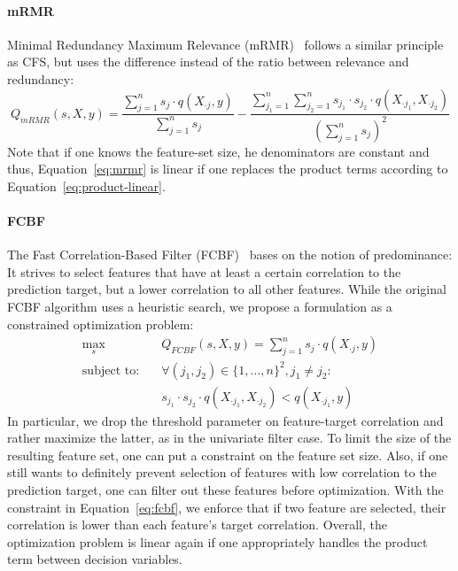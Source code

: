 \documentclass{article}
\theoremstyle{definition}
\begin{document}
\paragraph{mRMR}

Minimal Redundancy Maximum Relevance (mRMR)~\cite{peng2005feature} follows a similar principle as CFS, but uses the difference instead of the ratio between relevance and redundancy:
%
\begin{equation}
	Q_{mRMR}(s,X,y) = \frac{\sum_{j=1}^{n} s_j \cdot q(X_{\cdot{}j},y)}{\sum_{j=1}^{n} s_j} - \frac{\sum_{j_1=1}^{n} \sum_{j_2=1}^{n} s_{j_1} \cdot s_{j_2} \cdot q(X_{\cdot{}j_1}, X_{\cdot{}j_2})}{(\sum_{j=1}^{n} s_j)^2}
	\label{eq:mrmr}
\end{equation}
%
Note that if one knows the feature-set size, he denominators are constant and thus, Equation~\ref{eq:mrmr} is linear if one replaces the product terms according to Equation~\ref{eq:product-linear}.

\paragraph{FCBF}

The Fast Correlation-Based Filter (FCBF)~\cite{yu2003feature} bases on the notion of predominance:
It strives to select features that have at least a certain correlation to the prediction target, but a lower correlation to all other features.
While the original FCBF algorithm uses a heuristic search, we propose a formulation as a constrained optimization problem:
%
\begin{align}
	\max_s &\quad Q_{FCBF}(s,X,y) = \sum_{j=1}^{n} s_j \cdot q(X_{\cdot{}j},y) \nonumber \\
	\text{subject to:} &\quad \forall (j_1,j_2) \in \{1, \dots, n\}^2, j_1 \neq j_2: \nonumber \\
	&\quad s_{j_1} \cdot s_{j_2} \cdot q(X_{\cdot{}j_1}, X_{\cdot{}j_2}) < q(X_{\cdot{}j_1},y)
	\label{eq:fcbf}
\end{align}
%
In particular, we drop the threshold parameter on feature-target correlation and rather maximize the latter, as in the univariate filter case.
To limit the size of the resulting feature set, one can put a constraint on the feature set size.
Also, if one still wants to definitely prevent selection of features with low correlation to the prediction target, one can filter out these features before optimization.
With the constraint in Equation~\ref{eq:fcbf}, we enforce that if two feature are selected, their correlation is lower than each feature's target correlation.
Overall, the optimization problem is linear again if one appropriately handles the product term between decision variables.
\end{document}
